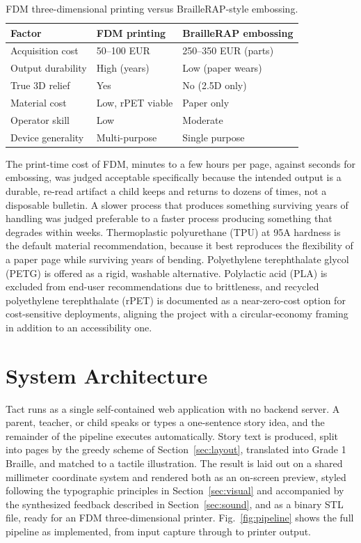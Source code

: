 \documentclass[conference]{IEEEtran}
\begin{document}
\begin{table}[t]
\caption{FDM three-dimensional printing versus BrailleRAP-style embossing.}
\label{tab:hardware}
\centering
\begin{tabular}{lll}
\toprule
Factor & FDM printing & BrailleRAP embossing \\
\midrule
Acquisition cost & 50--100 EUR & 250--350 EUR (parts) \\
Output durability & High (years) & Low (paper wears) \\
True 3D relief & Yes & No (2.5D only) \\
Material cost & Low, rPET viable & Paper only \\
Operator skill & Low & Moderate \\
Device generality & Multi-purpose & Single purpose \\
\bottomrule
\end{tabular}
\end{table}

The print-time cost of FDM, minutes to a few hours per page, against seconds for embossing, was judged acceptable specifically because the intended output is a durable, re-read artifact a child keeps and returns to dozens of times, not a disposable bulletin. A slower process that produces something surviving years of handling was judged preferable to a faster process producing something that degrades within weeks. Thermoplastic polyurethane (TPU) at 95A hardness is the default material recommendation, because it best reproduces the flexibility of a paper page while surviving years of bending. Polyethylene terephthalate glycol (PETG) is offered as a rigid, washable alternative. Polylactic acid (PLA) is excluded from end-user recommendations due to brittleness, and recycled polyethylene terephthalate (rPET) is documented as a near-zero-cost option for cost-sensitive deployments, aligning the project with a circular-economy framing in addition to an accessibility one.

\section{System Architecture}\label{sec:architecture}

Tact runs as a single self-contained web application with no backend server. A parent, teacher, or child speaks or types a one-sentence story idea, and the remainder of the pipeline executes automatically. Story text is produced, split into pages by the greedy scheme of Section~\ref{sec:layout}, translated into Grade 1 Braille, and matched to a tactile illustration. The result is laid out on a shared millimeter coordinate system and rendered both as an on-screen preview, styled following the typographic principles in Section~\ref{sec:visual} and accompanied by the synthesized feedback described in Section~\ref{sec:sound}, and as a binary STL file, ready for an FDM three-dimensional printer. Fig.~\ref{fig:pipeline} shows the full pipeline as implemented, from input capture through to printer output.
\end{document}
